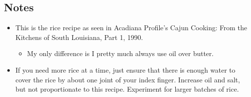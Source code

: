 \begin{multicols}{2}
\subsection*{Notes}
\begin{itemize}
    \item This is the rice recipe as seen in Acadiana Profile’s Cajun Cooking: From the Kitchens of South Louisiana, Part 1, 1990.
    \begin{itemize}
        \item My only difference is I pretty much always use oil over butter.
    \end{itemize}
    \item If you need more rice at a time, just ensure that there is enough water to cover the rice by about one joint of your index finger. Increase oil and salt, but not proportionate to this recipe. Experiment for larger batches of rice.
\end{itemize}
\end{multicols}
\clearpage